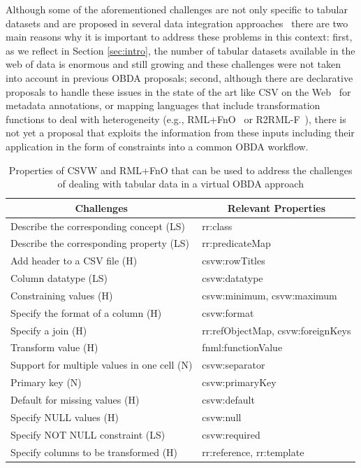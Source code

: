 Although some of the aforementioned challenges are not only specific to tabular datasets and are proposed in several data integration approaches~\citep{golshan2017data,halevy2006data,doan2012principles} there are two main reasons why it is important to address these problems in this context: first, as we reflect in Section \ref{sec:intro}, the number of tabular datasets available in the web of data is enormous and still growing and these challenges were not taken into account in previous OBDA proposals; second, although there are declarative proposals to handle these issues in the state of the art like CSV on the Web~\citep{tennison2015model} for metadata annotations, or mapping languages that include transformation functions to deal with heterogeneity (e.g., RML+FnO~\citep{de2017declarative} or R2RML-F~\citep{debruyne2016r2rml}), there is not yet a proposal that exploits the information from these inputs including their application in the form of constraints into a common OBDA workflow.



\begin{table}[]
\centering
\caption{Properties of CSVW and RML+FnO that can be used to address the challenges of dealing with tabular data in a virtual OBDA approach}
\label{tab:features}
\begin{tabular}{l|l}
\hline
\multicolumn{1}{c|}{\textbf{Challenges}} & \multicolumn{1}{c}{\textbf{Relevant Properties}} \\ \hline
Describe the corresponding concept (LS) & rr:class \\ \hline
Describe the corresponding property (LS) & rr:predicateMap \\ \hline
Add header to a CSV file (H) & csvw:rowTitles \\ \hline
Column datatype (LS) & csvw:datatype \\ \hline
Constraining values (H) & csvw:minimum, csvw:maximum \\ \hline
Specify the format of a column (H) & csvw:format \\ \hline
Specify a join (H) & rr:refObjectMap, csvw:foreignKeys \\ \hline
Transform value (H) & fnml:functionValue \\ \hline
Support for multiple values in one cell (N) & csvw:separator \\ \hline
Primary key (N) &  csvw:primaryKey \\ \hline
Default for missing values (H) & csvw:default \\ \hline
Specify NULL values (H) & csvw:null \\ \hline
Specify NOT NULL constraint (LS) & csvw:required \\ \hline
Specify columns to be transformed (H) & rr:reference, rr:template \\ \hline
\end{tabular}

\end{table}

